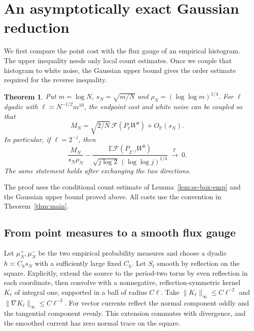 \documentclass[11pt]{article}
\newtheorem{theorem}{Theorem}
\newcommand{\1}{\mathbf{1}}
\numberwithin{equation}{section}
\begin{document}
\section{An asymptotically exact Gaussian reduction}
\label{sec:exact-transfer}

We first compare the point cost with the flux gauge of an empirical
histogram. The upper inequality needs only local count estimates.
Once we couple that histogram to white noise, the Gaussian upper
bound gives the order estimate required for the reverse inequality.

\begin{theorem}\label{thm:exact-transfer}
Put \(m=\log N\), \(s_N=\sqrt{m/N}\) and
\(\rho_N=(\log\log m)^{1/4}\).
For \(\ell\) dyadic with
\(\ell\asymp N^{-1/2}m^{10}\), the endpoint cost and white
noise can be coupled so that
\begin{equation}\label{eq:exact-coupling}
 M_N=\sqrt{2/N}\,\mathcal F(P_\ell W^0)+O_{\mathbb P}(s_N).
\end{equation}
In particular, if \(\ell=2^{-j}\), then
\begin{equation}\label{eq:exact-mean-reduction}
 \frac{M_N}{s_N\rho_N}-
 \frac{\mathbb E\mathcal F(P_{2^{-j}}W^0)}
 {\sqrt{j\log 2}\,(\log\log j)^{1/4}}
 \ \xrightarrow{\mathbb P}\ 0 .
\end{equation}
The same statement holds after exchanging the two directions.
\end{theorem}

The proof uses the conditional count estimate of
Lemma~\ref{lem:sc-box-emp} and the Gaussian upper bound proved above.
All costs use the convention in Theorem~\ref{thm:main}.

\subsection{From point measures to a smooth flux gauge}

Let \(\mu_N^+,\mu_N^-\) be the two empirical probability
measures and choose a dyadic \(h\asymp C_h s_N\) with a
sufficiently large fixed \(C_h\). Let \(S_\ell\) smooth by
reflection on the square. Explicitly, extend the source to the
period-two torus by even reflection in each coordinate, then
convolve with a nonnegative, reflection-symmetric kernel
\(K_\ell\) of integral one, supported in a ball of radius
\(C\ell\). Take \(\|K_\ell\|_\infty\le C\ell^{-2}\) and
\(\|\nabla K_\ell\|_\infty\le C\ell^{-3}\). For vector currents
reflect the normal component oddly and the tangential component
evenly. This extension commutes with divergence, and the
smoothed current has zero normal trace on the square.
\end{document}
